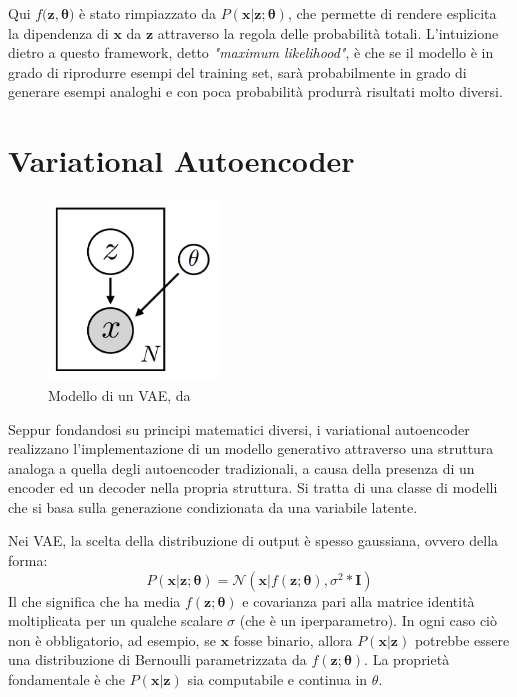 Qui $f(\boldsymbol{z}, \boldsymbol{\theta)}$ è stato rimpiazzato da $P(\boldsymbol{x} | \boldsymbol{z}; \boldsymbol{\theta})$, che permette di rendere esplicita la dipendenza di $\boldsymbol{x}$ da $\boldsymbol{z}$ attraverso la regola delle probabilità totali. L'intuizione dietro a questo framework, detto \textit{"maximum likelihood"}, è che se il modello è in grado di riprodurre esempi del training set, sarà probabilmente in grado di generare esempi analoghi e con poca probabilità produrrà risultati molto diversi.
\section{Variational Autoencoder}
\label{sec:vae}
\begin{figure}[ht]
	\centering
	\includegraphics[width=0.4\textwidth]{img/vae_model.png}
	\caption{Modello di un VAE, da \cite{VAE_tut}}
	\label{fig:1.13}
\end{figure}
Seppur fondandosi su principi matematici diversi, i variational autoencoder \cite{VAE} realizzano l'implementazione di un modello generativo attraverso una struttura analoga a quella degli autoencoder tradizionali, a causa della presenza di un encoder ed un decoder nella propria struttura. Si tratta di una classe di modelli che si basa sulla generazione condizionata da una variabile latente.

Nei VAE, la scelta della distribuzione di output è spesso gaussiana, ovvero della forma:
\begin{equation}
	\label{gaussian_probability}
	P(\boldsymbol{x} | \boldsymbol{z}; \boldsymbol{\theta}) = \mathcal{N}(\boldsymbol{x}|f(\boldsymbol{z}; \boldsymbol{\theta}), \sigma^2 * \boldsymbol{I})
\end{equation}
Il che significa che ha media $f(\boldsymbol{z}; \boldsymbol{\theta})$ e covarianza pari alla matrice identità moltiplicata per un qualche scalare $\sigma$ (che è un iperparametro). In ogni caso ciò non è obbligatorio, ad esempio, se $\boldsymbol{x}$ fosse binario, allora $P(\boldsymbol{x} | \boldsymbol{z})$ potrebbe essere una distribuzione di Bernoulli parametrizzata da $f(\boldsymbol{z}; \boldsymbol{\theta})$. La proprietà fondamentale è che $P(\boldsymbol{x} | \boldsymbol{z})$ sia computabile e continua in $\theta$.

